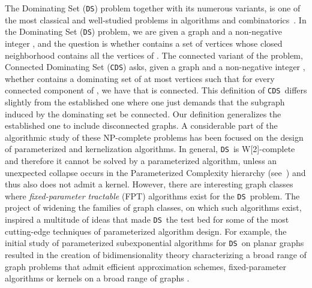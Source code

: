 \documentclass[11pt]{article}
\newcommand{\tDS}{{\texttt{\sc DS}}}
\newcommand{\tCDS}{{\texttt{\sc CDS}}}
\begin{document}
 
The {\sc Dominating Set} (\tDS) problem
 together with its numerous variants, is one of the most  classical and well-studied problems in algorithms and combinatorics~\cite{HaynesHS98}. 
In the {\sc Dominating Set} (\tDS) problem,
we are given a graph  and a non-negative integer , and the question is 
whether  contains a set of  vertices whose closed neighborhood contains all the vertices of .  
The connected variant of the problem,  {\sc Connected Dominating Set} (\tCDS) asks, given a graph  and a non-negative 
integer , whether  contains a dominating set  of at most  vertices such that 
for every connected component  of , we have that  is connected.  
This definition of \tCDS\ differs slightly from the established one where one just  demands that  
the subgraph induced by the dominating set  be connected. Our definition generalizes the established 
one  to  include disconnected graphs. 
A  considerable part of the algorithmic  study of these {\sf NP}-complete  problems has been focused on the  design of parameterized and kernelization algorithms. In general,  \tDS \,  is {\sf W}[2]-complete 
and therefore it cannot be solved by a parameterized algorithm, 
unless an unexpected collapse occurs in the 
Parameterized Complexity hierarchy (see~\cite{DowneyF98,FlumGrohebook,Niedermeierbook06}) and thus also does not admit a kernel.  
However, there are  interesting graph classes where  {\em fixed-parameter tractable} {\sf  (FPT)}  algorithms exist
for the \tDS \, problem. The project of  widening the families of graph classes, on which such algorithms exist, inspired a multitude of  ideas that made \tDS \,  the test bed for some of the most cutting-edge techniques of parameterized algorithm design. For example, the initial study of parameterized subexponential algorithms for \tDS \, on planar graphs \cite{AlberBFKN02,DemaineFHT05talg,FominT06} resulted in the creation of bidimensionality theory
characterizing a broad range of graph problems  that admit efficient approximation schemes, fixed-parameter algorithms or kernels on a broad range of graphs \cite{DemaineFHT05sub,DemaineH07-CJ,DornFLRS10,FominLRS10,F.V.Fomin:2010oq,FominLS12}. 
 
\end{document}
